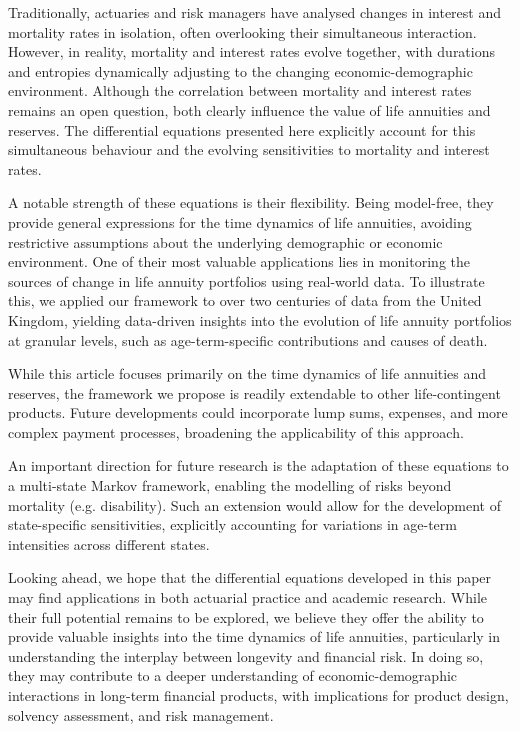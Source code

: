 \documentclass[12pt]{article}
\begin{document}
Traditionally, actuaries and risk managers have analysed changes in interest and mortality rates in isolation, often overlooking their simultaneous interaction. However, in reality, mortality and interest rates evolve together, with durations and entropies dynamically adjusting to the changing economic-demographic environment. Although the correlation between mortality and interest rates remains an open question, both clearly influence the value of life annuities and reserves. The differential equations presented here explicitly account for this simultaneous behaviour and the evolving sensitivities to mortality and interest rates.

A notable strength of these equations is their flexibility. Being model-free, they provide general expressions for the time dynamics of life annuities, avoiding restrictive assumptions about the underlying demographic or economic environment. One of their most valuable applications lies in monitoring the sources of change in life annuity portfolios using real-world data. To illustrate this, we applied our framework to over two centuries of data from the United Kingdom, yielding data-driven insights into the evolution of life annuity portfolios at granular levels, such as age-term-specific contributions and causes of death.


While this article focuses primarily on the time dynamics of life annuities and reserves, the framework we propose is readily extendable to other life-contingent products. Future developments could incorporate lump sums, expenses, and more complex payment processes, broadening the applicability of this approach.

An important direction for future research is the adaptation of these equations to a multi-state Markov framework, enabling the modelling of risks beyond mortality (e.g. disability). Such an extension would allow for the development of state-specific sensitivities, explicitly accounting for variations in age-term intensities across different states.


Looking ahead, we hope that the differential equations developed in this paper may find applications in both actuarial practice and academic research. While their full potential remains to be explored, we believe they offer the ability to provide valuable insights into the time dynamics of life annuities, particularly in understanding the interplay between longevity and financial risk. In doing so, they may contribute to a deeper understanding of economic-demographic interactions in long-term financial products, with implications for product design, solvency assessment, and risk management.
\end{document}
